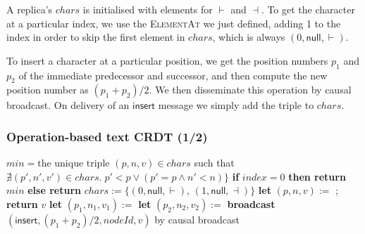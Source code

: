 A replica's $\mathit{chars}$ is initialised with elements for $\vdash$ and $\dashv$.
To get the character at a particular index, we use the \textsc{ElementAt} we just defined, adding 1 to the index in order to skip the first element in $\mathit{chars}$, which is always $(0,\mathsf{null},\vdash)$.

To insert a character at a particular position, we get the position numbers $p_1$ and $p_2$ of the immediate predecessor and successor, and then compute the new position number as $(p_1+p_2)/2$.
We then disseminate this operation by causal broadcast.
On delivery of an $\mathsf{insert}$ message we simply add the triple to $\mathit{chars}$.

\begin{frame}
    \label{s:text-crdt-alg1}
    \frametitle{Operation-based text CRDT (1/2)}
    \footnotesize
    \begin{algorithmic}
            \State $\mathit{min} = \text{the unique triple } (p,n,v) \in \mathit{chars}$ such that
            \State \hspace{3.1em}$\nexists (p',n',v') \in \mathit{chars}.\; p' < p \vee (p' = p \wedge n' < n)\}$
            \State \textbf{if} $\mathit{index}=0$ \textbf{then return} $\mathit{min}$
            \State \textbf{else return} 
        \EndFunction
        \State
            \State $\mathit{chars} := \{(0, \mathsf{null}, \vdash),\, (1, \mathsf{null}, \dashv)\}$
        \EndOn
        \State
            \State \textbf{let} $(p,n,v) := $ ; \textbf{return} $v$
        \EndOn
        \State
            \State \textbf{let} $(p_1,n_1,v_1) := $ 
            \State \textbf{let} $(p_2,n_2,v_2) := $ 
            \State \textbf{broadcast} $(\mathsf{insert}, (p_1+p_2)/2, \mathit{nodeId}, v)$ by causal broadcast
        \EndOn
    \end{algorithmic}
\end{frame}
\label{l:text-crdt-alg1}

